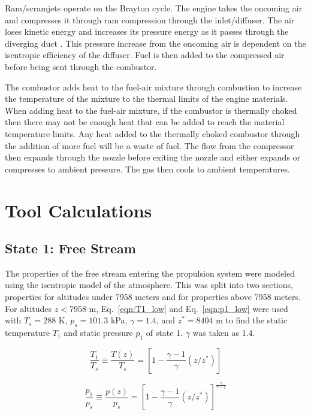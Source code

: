 \documentclass[conf]{new-aiaa} %
\begin{document}
Ram/scramjets operate on the Brayton cycle. The engine takes the oncoming air and compresses it through ram compression through the inlet/diffuser. The air loses kinetic energy and increases its pressure energy as it passes through the diverging duct \cite{rycey1996jetengine}. This pressure increase from the oncoming air is dependent on the isentropic efficiency of the diffuser. Fuel is then added to the compressed air before being sent through the combustor.

The combustor adds heat to the fuel-air mixture through combustion to increase the temperature of the mixture to the thermal limits of the engine materials. When adding heat to the fuel-air mixture, if the combustor is thermally choked then there may not be enough heat that can be added to reach the material temperature limits. Any heat added to the thermally choked combustor through the addition of more fuel will be a waste of fuel. The flow from the compressor then expands through the nozzle before exiting the nozzle and either expands or compresses to ambient pressure. The gas then cools to ambient temperatures.


\section{Tool Calculations} \label{sec:tool_calculations}
\subsection{State 1: Free Stream}
The properties of the free stream entering the propulsion system were modeled using the isentropic model of the atmosphere. This was split into two sections, properties for altitudes under 7958 meters and for properties above 7958 meters. For altitudes $z<7958$ m, Eq.~\eqref{eqn:T1_low} and Eq.~\eqref{eqn:p1_low} were used with $T_s=288$ K, $p_s=101.3$ kPa, $\gamma=1.4$, and $z^*=8404$ m to find the static temperature $T_1$ and static pressure $p_1$ of state 1. $\gamma$ was taken as 1.4.

\begin{equation}
    \label{eqn:T1_low}
    \frac{T_1}{T_s}\equiv\frac{T(z)}{T_s}=\left[1-\frac{\gamma-1}{\gamma}(z/z^*)\right]
\end{equation}

\begin{equation}
    \label{eqn:p1_low}
    \frac{p_1}{p_s}\equiv\frac{p(z)}{p_s}=\left[1-\frac{\gamma-1}{\gamma}(z/z^*)\right]^\frac{\gamma}{\gamma-1}
\end{equation}
\end{document}
